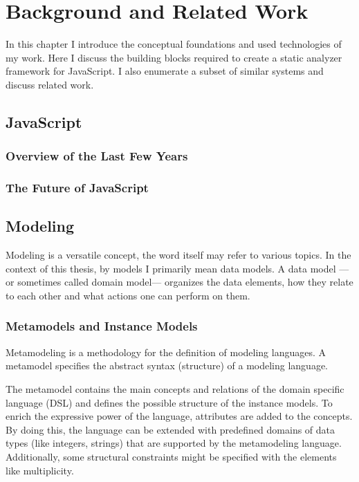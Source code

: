 \chapter{Background and Related Work}
\label{chap:background-and-related-work}

In this chapter I introduce the conceptual foundations and used technologies of my work. Here I discuss the building blocks required to create a static analyzer framework for JavaScript. I also enumerate a subset of similar systems and discuss related work.

\section{JavaScript}
\subsection{Overview of the Last Few Years}
\subsection{The Future of JavaScript}

\section{Modeling}
Modeling is a versatile concept, the word itself may refer to various topics. In the context of this thesis, by models I primarily mean data models. A data model ---or sometimes called domain model--- organizes the data elements, how they relate to each other and what actions one can perform on them.

\subsection{Metamodels and Instance Models}
Metamodeling is a methodology for the definition of modeling languages. A metamodel specifies the abstract syntax (structure) of a modeling language.~\cite{scm}

The metamodel contains the main concepts and relations of the domain specific language (DSL) and defines the possible structure of the instance models. To enrich the expressive power of the language, attributes are added to the concepts. By doing this, the language can be extended with predefined domains of data types (like integers, strings) that are supported by the metamodeling language. Additionally, some structural constraints might be specified with the elements like multiplicity.

